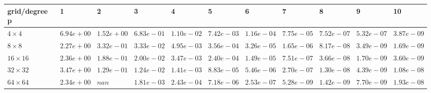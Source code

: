 \begin{tabular}{lllllllllll}
\hline
 grid/degree p   & 1          & 2          & 3          & 4          & 5          & 6          & 7          & 8          & 9          & 10         \\
\hline
 $4 \times 4$    & $6.94e+00$ & $1.52e+00$ & $6.83e-01$ & $1.10e-02$ & $7.42e-03$ & $1.16e-04$ & $7.75e-05$ & $7.52e-07$ & $5.32e-07$ & $3.87e-09$ \\
 $8 \times 8$    & $2.27e+00$ & $3.32e-01$ & $3.33e-02$ & $4.95e-03$ & $3.56e-04$ & $3.26e-05$ & $1.65e-06$ & $8.17e-08$ & $3.49e-09$ & $1.69e-09$ \\
 $16 \times 16$  & $2.36e+00$ & $1.88e-01$ & $2.00e-02$ & $3.47e-03$ & $2.40e-04$ & $1.49e-05$ & $7.51e-07$ & $3.66e-08$ & $1.70e-09$ & $3.60e-09$ \\
 $32 \times 32$  & $3.47e+00$ & $1.29e-01$ & $1.24e-02$ & $1.41e-03$ & $8.83e-05$ & $5.46e-06$ & $2.70e-07$ & $1.30e-08$ & $4.39e-09$ & $1.08e-08$ \\
 $64 \times 64$  & $2.34e+00$ & $nan$      & $1.81e-03$ & $2.43e-04$ & $7.18e-06$ & $2.53e-07$ & $5.28e-09$ & $1.42e-09$ & $7.70e-09$ & $1.93e-08$ \\
\hline
\end{tabular}